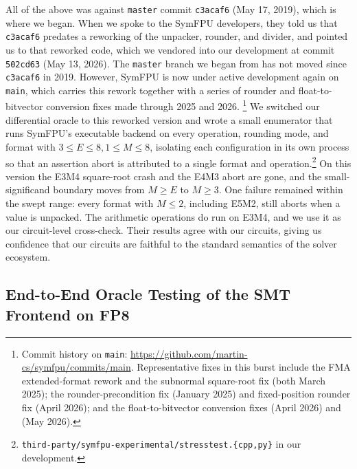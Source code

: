All of the above was against \texttt{master} commit \texttt{c3acaf6} (May 17, 2019), which is where we
began. When we spoke to the SymFPU developers,
they told us that \texttt{c3acaf6} predates a reworking of the unpacker, rounder, and divider, and pointed
us to that reworked code, which we vendored into our development at commit \texttt{502cd63} (May 13, 2026).
The \texttt{master} branch we began from has not moved since \texttt{c3acaf6} in 2019.
However, SymFPU is now under active development again on \texttt{main}, which carries this rework
together with a series of rounder and float-to-bitvector conversion fixes made through 2025 and 2026.
\footnote{Commit history on \texttt{main}: \url{https://github.com/martin-cs/symfpu/commits/main}.
Representative fixes in this burst include the FMA extended-format rework  and the subnormal square-root fix  (both March 2025);
the rounder-precondition fix  (January 2025) and fixed-position rounder fix  (April 2026);
and the float-to-bitvector conversion fixes  (April 2026) and  (May 2026).}
We switched our differential oracle to this reworked version and wrote a small
enumerator that runs SymFPU's executable backend on every operation, rounding mode, and
format with $3 \le E \le 8, 1 \le M \le 8$, isolating each configuration in its own
process so that an assertion abort is attributed to a single format and operation.\footnote{\texttt{third-party/symfpu-experimental/stresstest.\{cpp,py\}} in our development.}
On this version the E3M4 square-root crash and the E4M3 abort are gone, and the
small-significand boundary moves from $M \ge E$ to $M \ge 3$.
One failure remained within the swept range: every format with $M \le 2$, including E5M2,
still aborts when a value is unpacked.
The arithmetic operations do run on E3M4, and we use it as our circuit-level cross-check.
Their results agree with our circuits, giving us confidence that our circuits are faithful
to the standard semantics of the solver ecosystem.

\subsection{End-to-End Oracle Testing of the SMT Frontend on FP8}\label{sec:fp:fptg-oracle}

